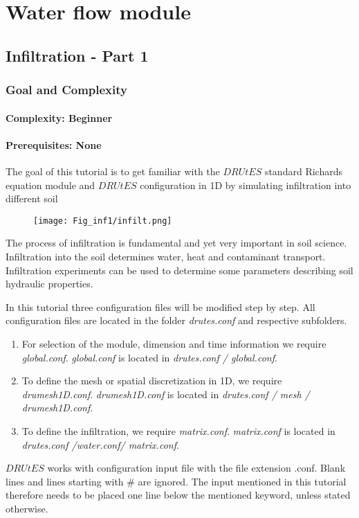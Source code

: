 \chapter{Water flow module}

\section{Infiltration - Part 1}
\subsection{Goal and Complexity}
\subsubsection*{Complexity: Beginner}

\subsubsection*{Prerequisites: None}

The goal of this tutorial is to get familiar with the $DRUtES$ standard Richards equation module and $DRUtES$ configuration in 1D by simulating infiltration into different soil \medskip

\begin{figure}[!h]
\centering
\texttt{[image: Fig\_inf1/infilt.png]}
\end{figure}
The process of infiltration is fundamental and yet very important in soil science. Infiltration into the soil determines water, heat and contaminant transport. Infiltration experiments can be used to determine some parameters describing soil hydraulic properties. 

In this tutorial three configuration files will be modified step by step. All configuration files are located in the folder \emph{drutes.conf} and respective subfolders. \begin{enumerate}
\item For selection of the module, dimension and time information we require \emph{global.conf}.  \emph{global.conf} is located in \emph{drutes.conf / global.conf}. 
\item To define the mesh or spatial discretization in 1D,  we require \emph{drumesh1D.conf}. \emph{drumesh1D.conf} is located in \emph{drutes.conf / mesh / drumesh1D.conf}. 
\item To define the infiltration, we require \emph{matrix.conf}. \emph{matrix.conf} is located in \emph{drutes.conf /water.conf/ matrix.conf}. 
\end{enumerate}
$DRUtES$ works with configuration input file with the file extension .conf. Blank lines and lines starting with \# are ignored. The input mentioned in this tutorial therefore needs to be placed one line below the mentioned keyword, unless stated otherwise. 

